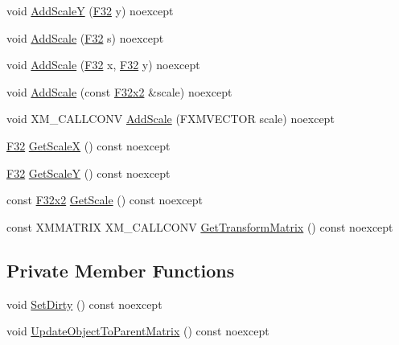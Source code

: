 \begin{DoxyCompactItemize}
void \hyperlink{classmage_1_1_sprite_transform_ad2254dc1ae1fc1d9332bd00fed8eb4af}{Add\+ScaleY} (\hyperlink{namespacemage_aa97e833b45f06d60a0a9c4fc22ae02c0}{F32} y) noexcept
\item 
void \hyperlink{classmage_1_1_sprite_transform_a44dd155f58f2ebdb7e44a366933863fa}{Add\+Scale} (\hyperlink{namespacemage_aa97e833b45f06d60a0a9c4fc22ae02c0}{F32} s) noexcept
\item 
void \hyperlink{classmage_1_1_sprite_transform_a72cebc3612bc3ea91989234fb8fb03d2}{Add\+Scale} (\hyperlink{namespacemage_aa97e833b45f06d60a0a9c4fc22ae02c0}{F32} x, \hyperlink{namespacemage_aa97e833b45f06d60a0a9c4fc22ae02c0}{F32} y) noexcept
\item 
void \hyperlink{classmage_1_1_sprite_transform_aa997f073a285a0f8fc67a25c436cc122}{Add\+Scale} (const \hyperlink{namespacemage_aa87237ad091f5cd7da612b8523fc108f}{F32x2} \&scale) noexcept
\item 
void X\+M\+\_\+\+C\+A\+L\+L\+C\+O\+NV \hyperlink{classmage_1_1_sprite_transform_a9064eb670f25dbcd6937971b9ccaadda}{Add\+Scale} (F\+X\+M\+V\+E\+C\+T\+OR scale) noexcept
\item 
\hyperlink{namespacemage_aa97e833b45f06d60a0a9c4fc22ae02c0}{F32} \hyperlink{classmage_1_1_sprite_transform_af82246da3228dfc1588ca806ddf6315f}{Get\+ScaleX} () const noexcept
\item 
\hyperlink{namespacemage_aa97e833b45f06d60a0a9c4fc22ae02c0}{F32} \hyperlink{classmage_1_1_sprite_transform_a07010f5d7e781ca641456b18fd16e67f}{Get\+ScaleY} () const noexcept
\item 
const \hyperlink{namespacemage_aa87237ad091f5cd7da612b8523fc108f}{F32x2} \hyperlink{classmage_1_1_sprite_transform_a5dd81c8943599dc25952d8c62fb81252}{Get\+Scale} () const noexcept
\item 
const X\+M\+M\+A\+T\+R\+IX X\+M\+\_\+\+C\+A\+L\+L\+C\+O\+NV \hyperlink{classmage_1_1_sprite_transform_ac9d30bb4a52ababcdee4514aac7f7402}{Get\+Transform\+Matrix} () const noexcept
\end{DoxyCompactItemize}
\subsection*{Private Member Functions}
\begin{DoxyCompactItemize}
\item 
void \hyperlink{classmage_1_1_sprite_transform_ab76e0ca7d8f4e37a8a6f58a7a9face17}{Set\+Dirty} () const noexcept
\item 
void \hyperlink{classmage_1_1_sprite_transform_a92ae51f7dbf034d119625f70aa7fad1c}{Update\+Object\+To\+Parent\+Matrix} () const noexcept
\end{DoxyCompactItemize}
